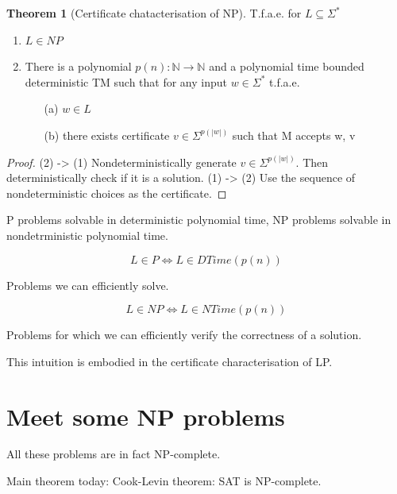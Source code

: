 \documentclass[a4paper,12pt]{article}
\theoremstyle{definition}
\newtheorem{theorem}[counter]{Theorem}
\theoremstyle{remark}
\newcommand{\N}{\mathbb{N}}
\begin{document}
\begin{theorem}[Certificate chatacterisation of NP]

    T.f.a.e. for $L \subseteq \Sigma^*$
    \begin{enumerate}
        \item $L \in NP$
        \item There is a polynomial $p(n): \N \to \N$ and a polynomial time bounded deterministic TM such that for any input $w \in \Sigma^*$ t.f.a.e.
        \begin{itemize}
            \item[(a)] $w \in L$
            \item[(b)] there exists certificate $v \in \Sigma^{p(|w|)}$ such that M accepts w, v
        \end{itemize}
    \end{enumerate}

\end{theorem}

\begin{proof}
    (2) -> (1) Nondeterministically generate $v \in \Sigma^{p(|w|)}$. Then deterministically check if it is a solution.
    (1) -> (2) Use the sequence of nondeterministic choices as the certificate.
\end{proof}






\newpage
P problems solvable in deterministic polynomial time, NP problems solvable in nondetrministic polynomial time.

\begin{equation*}
    L \in P \iff L \in DTime(p(n))
\end{equation*}

Problems we can efficiently solve.

\begin{equation*}
    L \in NP \iff L \in NTime(p(n))
\end{equation*}


Problems for which we can efficiently verify the correctness of a solution.

This intuition is embodied in the certificate characterisation of LP.

\section{Meet some NP problems}
All these problems are in fact NP-complete.

Main theorem today: Cook-Levin theorem: SAT is NP-complete.
\end{document}
